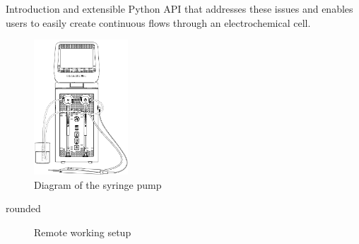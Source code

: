 \documentclass[a0paper,landscape]{baposter}
\begin{document}
\begin{poster}
\begin{posterbox}[name=introduction,column=0]{Introduction}
and extensible Python API that addresses these issues and enables users to easily create continuous flows 
through an electrochemical cell.
\begin{figure}[H]
\begin{center}
\includegraphics[width=100pt]{images/syringediagram}
\caption{Diagram of the syringe pump}
\end{center}
\end{figure}
\end{posterbox}
\begin{posterbox}[column=0,headerfont={},headershape=rounded,boxheaderheight=0em,boxColorOne=white,borderColor=white,below=introduction]{rounded}
\begin{figure}[H]
\begin{center}
\vspace{-1em}
\caption{Remote working setup}
\end{center}

\end{figure}
\end{posterbox}
\end{poster}
\end{document}
